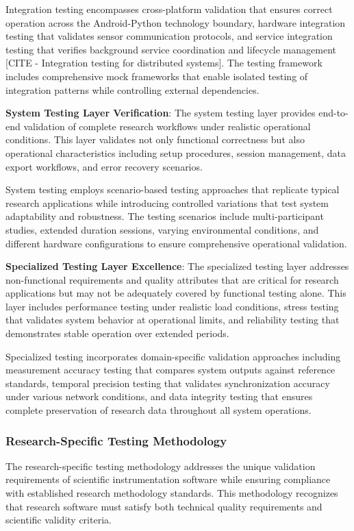 \documentclass[12pt,a4paper]{article}
\begin{document}
Integration testing encompasses cross-platform validation that ensures correct operation across the Android-Python
technology boundary, hardware integration testing that validates sensor communication protocols, and service integration
testing that verifies background service coordination and lifecycle
management [CITE - Integration testing for distributed systems]. The testing framework includes comprehensive mock
frameworks that enable isolated testing of integration patterns while controlling external dependencies.

\textbf{System Testing Layer Verification}: The system testing layer provides end-to-end validation of complete research
workflows under realistic operational conditions. This layer validates not only functional correctness but also
operational characteristics including setup procedures, session management, data export workflows, and error recovery
scenarios.

System testing employs scenario-based testing approaches that replicate typical research applications while introducing
controlled variations that test system adaptability and robustness. The testing scenarios include multi-participant
studies, extended duration sessions, varying environmental conditions, and different hardware configurations to ensure
comprehensive operational validation.

\textbf{Specialized Testing Layer Excellence}: The specialized testing layer addresses non-functional requirements and
quality attributes that are critical for research applications but may not be adequately covered by functional testing
alone. This layer includes performance testing under realistic load conditions, stress testing that validates system
behavior at operational limits, and reliability testing that demonstrates stable operation over extended periods.

Specialized testing incorporates domain-specific validation approaches including measurement accuracy testing that
compares system outputs against reference standards, temporal precision testing that validates synchronization accuracy
under various network conditions, and data integrity testing that ensures complete preservation of research data
throughout all system operations.

\subsubsection{Research-Specific Testing Methodology}

The research-specific testing methodology addresses the unique validation requirements of scientific instrumentation
software while ensuring compliance with established research methodology standards. This methodology recognizes that
research software must satisfy both technical quality requirements and scientific validity criteria.
\end{document}
